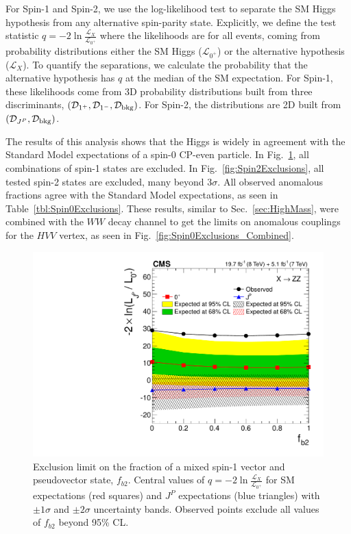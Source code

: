For Spin-1 and Spin-2, we use the log-likelihood test to separate the SM Higgs hypothesis from any alternative spin-parity state. Explicitly, we define the test statistic $q = -2 \ln \frac{\mathcal{L}_X}{\mathcal{L}_{0^+}}$ where the likelihoods are for all events, coming from probability distributions either the SM Higgs ($\mathcal{L}_{0^+}$) or the alternative hypothesis ($\mathcal{L}_{X}$). To quantify the separations, we calculate the probability that the alternative hypothesis has $q$ at the median of the SM expectation. For Spin-1, these likelihoods come from 3D probability distributions built from three discriminants, $({\mathcal{D}}_{1^+},{\mathcal{D}}_{1^-},{\mathcal{D}}_{\rm bkg})$. For Spin-2, the distributions are 2D built from $({\mathcal{D}}_{J^P},{\mathcal{D}}_{\rm bkg})$.

The results of this analysis shows that the Higgs is widely in agreement with the Standard Model expectations of a spin-0 CP-even particle. In Fig.~\ref{fig:Spin1Exclusions}, all combinations of spin-1 states are excluded. In Fig.~\ref{fig:Spin2Exclusions}, all tested spin-2 states are excluded, many beyond $3\sigma$. All observed anomalous fractions agree with the Standard Model expectations, as seen in Table~\ref{tbl:Spin0Exclusions}. These results, similar to Sec.~\ref{sec:HighMass}, were combined \cite{Khachatryan:2014kca} with the $WW$ decay channel to get the limits on anomalous couplings for the $HVV$ vertex, as seen in Fig.~\ref{fig:Spin0Exclusions_Combined}.

\begin{figure}[htbp]
\begin{center}
\includegraphics[width=.6\linewidth]{HiggsProperties/figures/summary_PI.pdf}
\caption[Exclusion Limits on Mixed Spin-1 State in $4l$ for $125.6$ $\rm{GeV}$ Higgs Boson]{Exclusion limit on the fraction of a mixed spin-1 vector and pseudovector state, $f_{b2}$. Central values of $q = -2 \ln \frac{\mathcal{L}_X}{\mathcal{L}_{0^+}}$ for SM expectations (red squares) and $J^P$ expectations (blue triangles) with $\pm1\sigma$ and $\pm2\sigma$ uncertainty bands. Observed points exclude all values of $f_{b2}$ beyond 95\% CL.}
\label{fig:Spin1Exclusions}
\end{center}
\end{figure}

